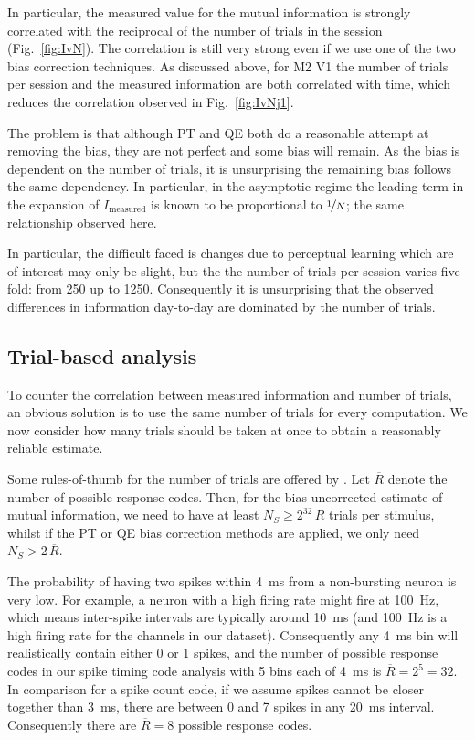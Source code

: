 In particular, the measured value for the mutual information is strongly correlated with the reciprocal of the number of trials in the session (Fig.~\ref{fig:IvN}).
The correlation is still very strong even if we use one of the two bias correction techniques.
As discussed above, for \ac{M2} \ac{V1} the number of trials per session and the measured information  are both correlated with time, which reduces the correlation observed in Fig.~\ref{fig:IvNj1}.

The problem is that although \ac{PT} and \ac{QE} both do a reasonable attempt at removing the bias, they are not perfect and some bias will remain.
As the bias is dependent on the number of trials, it is unsurprising the remaining bias follows the same dependency.
In particular, in the asymptotic regime the leading term in the expansion of $I_{\text{measured}}$ is known to be proportional \citep{Treves1995} to $\nicefrac{1}{N}$; the same relationship observed here.

In particular, the difficult faced is changes due to perceptual learning which are of interest may only be slight, but the the number of trials per session varies five-fold: from 250 up to 1250.
Consequently it is unsurprising that the observed differences in information day-to-day are dominated by the number of trials.

\subsection{Trial-based analysis}

To counter the correlation between measured information and number of trials, an obvious solution is to use the same number of trials for every computation.
We now consider how many trials should be taken at once to obtain a reasonably reliable estimate.

Some rules-of-thumb for the number of trials are offered by \citep{Panzeri2007}.
Let $\overline{R}$ denote the number of possible response codes.
Then, for the bias-uncorrected estimate of mutual information, we need to have at least $N_S \ge 2^{32} \, \overline{R}$ trials per stimulus,
whilst if the \ac{PT} or \ac{QE} bias correction methods are applied, we only need $N_S > 2 \, \overline{R}$.

The probability of having two spikes within \SI{4}{ms} from a non-bursting neuron is very low.
For example, a neuron with a high firing rate might fire at \SI{100}{Hz}, which means inter-spike intervals are typically around \SI{10}{ms} (and \SI{100}{Hz} is a high firing rate for the channels in our dataset).
Consequently any \SI{4}{ms} bin will realistically contain either 0 or 1 spikes, and the number of possible response codes in our spike timing code analysis with 5 bins each of \SI{4}{ms} is $\overline{R} = 2^5 = 32$.
In comparison for a spike count code, if we assume spikes cannot be closer together than \SI{3}{ms}, there are between 0 and 7 spikes in any \SI{20}{ms} interval.
Consequently there are $\overline{R} = 8$ possible response codes.


